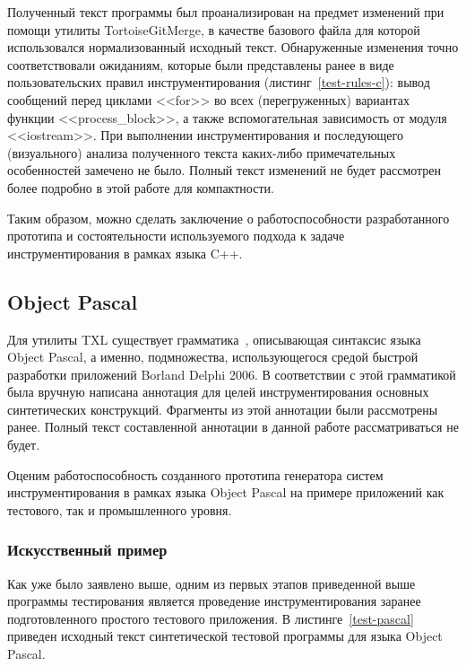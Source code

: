 Полученный текст программы был проанализирован на предмет изменений при помощи утилиты TortoiseGitMerge, в качестве базового файла для которой использовался нормализованный исходный текст.
Обнаруженные изменения точно соответствовали ожиданиям, которые были представлены ранее в виде пользовательских правил инструментирования (листинг~\ref{test-rules-c}):
вывод сообщений перед циклами <<for>> во всех (перегруженных) вариантах функции <<process\_block>>,
а также вспомогательная зависимость от модуля <<iostream>>.
При выполнении инструментирования и последующего (визуального) анализа полученного текста каких-либо примечательных особенностей замечено не было.
Полный текст изменений не будет рассмотрен более подробно в этой работе для компактности.

Таким образом, можно сделать заключение о работоспособности разработанного прототипа и состоятельности используемого подхода к задаче инструментирования в рамках языка C++.

\subsection{Object Pascal}

Для утилиты TXL существует грамматика~\cite{txl-resources}, описывающая синтаксис языка Object Pascal, а именно, подмножества, использующегося средой быстрой разработки приложений Borland Delphi 2006.
В соответствии с этой грамматикой была вручную написана аннотация для целей инструментирования основных синтетических конструкций.
Фрагменты из этой аннотации были рассмотрены ранее.
Полный текст составленной аннотации в данной работе рассматриваться не будет.

Оценим работоспособность созданного прототипа генератора систем инструментирования в рамках языка Object Pascal на примере приложений как тестового, так и промышленного уровня.

\subsubsection{Искусственный пример}

Как уже было заявлено выше, одним из первых этапов приведенной выше программы тестирования является проведение инструментирования заранее подготовленного простого тестового приложения.
В листинге~\ref{test-pascal} приведен исходный текст синтетической тестовой программы для языка Object Pascal.

